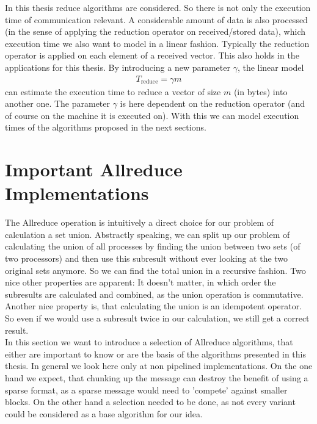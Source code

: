 In this thesis reduce algorithms are considered. So there is not only the execution time of communication relevant. A considerable amount of data is also processed (in the sense of applying the reduction operator on received/stored data), which execution time we also want to model in a linear fashion. Typically the reduction operator is applied on each element of a received vector. This also holds in the applications for this thesis. By introducing a new parameter $\gamma$, the linear model
\begin{align*}
	T_\mathrm{reduce} = \gamma m
\end{align*}
can estimate the execution time to reduce a vector of size $m$ (in bytes) into another one. The parameter $\gamma$ is here dependent on the reduction operator (and of course on the machine it is executed on). With this we can model execution times of the algorithms proposed in the next sections.

\section{Important Allreduce Implementations}
The Allreduce operation is intuitively a direct choice for our problem of calculation a set union. Abstractly speaking, we can split up our problem of calculating the union of all processes by finding the union between two sets (of two processors) and then use this subresult without ever looking at the two original sets anymore. So we can find the total union in a recursive fashion. Two nice other properties are apparent: It doesn't matter, in which order the subresults are calculated and combined, as the union operation is commutative. Another nice property is, that calculating the union is an idempotent operator. So even if we would use a subresult twice in our calculation, we still get a correct result. \\
In this section we want to introduce a selection of Allreduce algorithms, that either are important to know or are the basis of the algorithms presented in this thesis. In general we look here only at non pipelined implementations. On the one hand we expect, that chunking up the message can destroy the benefit of using a sparse format, as a sparse message would need to 'compete' against smaller blocks. On the other hand a selection needed to be done, as not every variant could be considered as a base algorithm for our idea.
  
